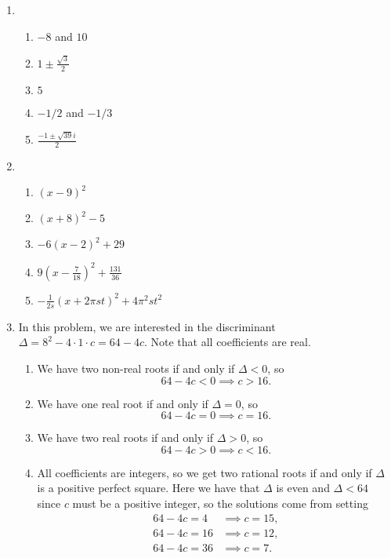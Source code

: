 \begin{enumerate}
\item \begin{enumerate}
\item $-8$ and $10$
\item $1\pm\frac{\sqrt{3}}{2}$
\item $5$
\item $-1/2$ and $-1/3$
\item $\frac{-1\pm\sqrt{39}i}{2}$
\end{enumerate}
\item \begin{enumerate}
\item $(x - 9)^2$
\item $(x + 8)^2 - 5$
\item $-6(x - 2)^2 + 29$
\item $\displaystyle 9\left(x - \frac{7}{18}\right)^2 + \frac{131}{36}$
\item $\displaystyle -\frac{1}{2s}(x + 2\pi st)^2 + 4\pi^2 st^2$
\end{enumerate}
\item In this problem, we are interested in the discriminant $\Delta = 8^2 - 4\cdot 1\cdot c = 64 - 4c$. Note that all coefficients are real.
\begin{enumerate}
\item We have two non-real roots if and only if $\Delta < 0$, so
\begin{equation*}
64 - 4c < 0\implies\boxed{c > 16}.
\end{equation*}
\item We have one real root if and only if $\Delta = 0$, so 
\begin{equation*}
64 - 4c = 0\implies\boxed{c = 16}.
\end{equation*}
\item We have two real roots if and only if $\Delta > 0$, so
\begin{equation*}
64 - 4c > 0\implies\boxed{c < 16}.
\end{equation*}
\item All coefficients are integers, so we get two rational roots if and only if $\Delta$ is a positive perfect square. Here we have that $\Delta$ is even and $\Delta < 64$ since $c$ must be a positive integer, so the solutions come from setting
\begin{align*}
64 - 4c = 4 &\implies c = \boxed{15}, \\
64 - 4c = 16 &\implies c = \boxed{12}, \\
64 - 4c = 36 & \implies c = \boxed{7}.

\end{align*}
\end{enumerate}
\end{enumerate}

